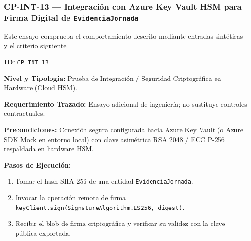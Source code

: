 \subsubsection*{CP-INT-13 — Integración con Azure Key Vault HSM para Firma Digital de \texttt{E\allowbreak{}v\allowbreak{}i\allowbreak{}d\allowbreak{}e\allowbreak{}n\allowbreak{}c\allowbreak{}i\allowbreak{}a\allowbreak{}J\allowbreak{}o\allowbreak{}r\allowbreak{}n\allowbreak{}a\allowbreak{}d\allowbreak{}a\allowbreak{}}}\label{sec:9-cp-int-13}
Este ensayo comprueba el comportamiento descrito mediante entradas sintéticas y el criterio siguiente.

\par\noindent\textbf{ID:} \texttt{C\allowbreak{}P\allowbreak{}-\allowbreak{}I\allowbreak{}N\allowbreak{}T\allowbreak{}-\allowbreak{}1\allowbreak{}3\allowbreak{}}\par
\par\noindent\textbf{Nivel y Tipología:} Prueba de Integración / Seguridad Criptográfica en Hardware (Cloud HSM).\par
\par\noindent\textbf{Requerimiento Trazado:} Ensayo adicional de ingeniería; no sustituye controles contractuales.\par
\par\noindent\textbf{Precondiciones:} Conexión segura configurada hacia Azure Key Vault (o Azure SDK Mock en entorno local) con clave asimétrica RSA 2048 / ECC P-256 respaldada en hardware HSM.\par
\par\noindent\textbf{Pasos de Ejecución:} \par
\begin{enumerate}
\item Tomar el hash SHA-256 de una entidad \texttt{E\allowbreak{}v\allowbreak{}i\allowbreak{}d\allowbreak{}e\allowbreak{}n\allowbreak{}c\allowbreak{}i\allowbreak{}a\allowbreak{}J\allowbreak{}o\allowbreak{}r\allowbreak{}n\allowbreak{}a\allowbreak{}d\allowbreak{}a\allowbreak{}}.
\item Invocar la operación remota de firma \texttt{k\allowbreak{}e\allowbreak{}y\allowbreak{}C\allowbreak{}l\allowbreak{}i\allowbreak{}e\allowbreak{}n\allowbreak{}t\allowbreak{}.\allowbreak{}s\allowbreak{}i\allowbreak{}g\allowbreak{}n\allowbreak{}(\allowbreak{}S\allowbreak{}i\allowbreak{}g\allowbreak{}n\allowbreak{}a\allowbreak{}t\allowbreak{}u\allowbreak{}r\allowbreak{}e\allowbreak{}A\allowbreak{}l\allowbreak{}g\allowbreak{}o\allowbreak{}r\allowbreak{}i\allowbreak{}t\allowbreak{}h\allowbreak{}m\allowbreak{}.\allowbreak{}E\allowbreak{}S\allowbreak{}2\allowbreak{}5\allowbreak{}6\allowbreak{},\allowbreak{} d\allowbreak{}i\allowbreak{}g\allowbreak{}e\allowbreak{}s\allowbreak{}t\allowbreak{})\allowbreak{}}.
\item Recibir el blob de firma criptográfica y verificar su validez con la clave pública exportada.
\end{enumerate}
